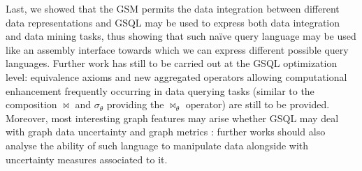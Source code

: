 Last, we showed that the GSM permits the data integration between different data representations and GSQL may be used to express both data integration and data mining tasks, thus showing that such naïve query language may be used like an assembly interface towards which we can express different possible query languages. Further work has still to be carried out at the GSQL optimization level: equivalence axioms and new aggregated operators allowing computational enhancement frequently occurring in data querying tasks (similar to the composition $\bowtie$ and $\sigma_\theta$ providing the $\bowtie_\theta$ operator) are still to be provided. Moreover, most interesting graph features may arise whether GSQL may deal with graph data uncertainty \cite{Getoor07} and graph metrics \cite{DMR}: further works should also analyse the ability of such language to manipulate data alongside with uncertainty measures associated to it.